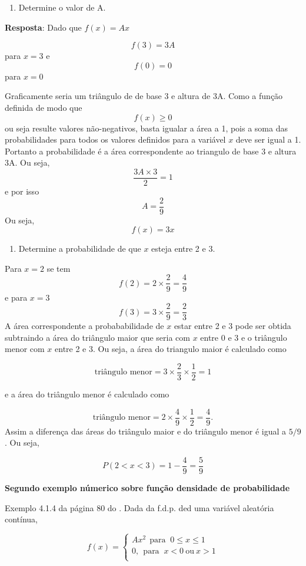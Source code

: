 \documentclass[
]{book}
\providecommand{\tightlist}{%
  \setlength{\itemsep}{0pt}\setlength{\parskip}{0pt}}
\begin{document}
\begin{enumerate}
\def\labelenumi{\alph{enumi})}
\tightlist
\item
  Determine o valor de A.
\end{enumerate}

\textbf{Resposta}: Dado que \(f(x) = Ax\)

\[
  f(3) = 3A
\]
para \(x = 3\) e
\[
  f(0)  = 0
\]
para \(x=0\)

Graficamente seria um triângulo de de base 3 e altura de 3A. Como a função definida de modo que
\[
  f(x) \geq 0
\]
ou seja resulte valores não-negativos, basta igualar a área a 1, pois a soma das probabilidades para todos os valores definidos para a variável \(x\) deve ser igual a 1. Portanto a probabilidade é a área correspondente ao triangulo de base 3 e altura 3A. Ou seja,
\[
  \dfrac{3A \times 3}{2} = 1
\]
e
por isso
\[
  A = \dfrac{2}{9}
\]
Ou seja,
\[
  f(x) = 3x
\]

\begin{enumerate}
\def\labelenumi{\alph{enumi})}
\setcounter{enumi}{1}
\tightlist
\item
  Determine a probabilidade de que \(x\) esteja entre 2 e 3.
\end{enumerate}

Para \(x=2\) se tem
\[
  f(2) = 2\times \dfrac{2}{9} = \dfrac{4}{9}
\]
e para \(x=3\)
\[
f(3) = 3 \times \dfrac{2}{9} = \dfrac{2}{3}
\]
A área correspondente a probababilidade de \(x\) estar entre 2 e 3 pode ser obtida subtraindo a área do triângulo maior que seria com \(x\) entre 0 e 3 e o triângulo menor com \(x\) entre 2 e 3. Ou seja, a área do triangulo maior é calculado como

\[
  \text{triângulo menor} = 3\times \dfrac{2}{3} \times \dfrac{1}{2} = 1
\]

e a área do triângulo menor é calculado como

\[
  \text{triângulo menor} = 2\times \dfrac{4}{9} \times \dfrac{1}{2} = \dfrac{4}{9}.
\]
Assim a diferença das áreas do triângulo maior e do triângulo menor é igual a \(5/9\). Ou seja,

\[
  P(2<x<3) = 1 - \dfrac{4}{9} = \dfrac{5}{9}
\]

\textbf{Segundo exemplo númerico sobre função densidade de probabilidade}

Exemplo 4.1.4 da página 80 do \citet{Sartoris2013}. Dada da f.d.p. ded uma variável aleatória contínua,

\[
  f(x) = 
    \begin{cases}
      Ax^2~~\text{para }~0\leq x \leq 1\\
      0,~~\text{para }~x<0~\text{ou}~x>1\\
    \end{cases}
  \]
\end{document}
